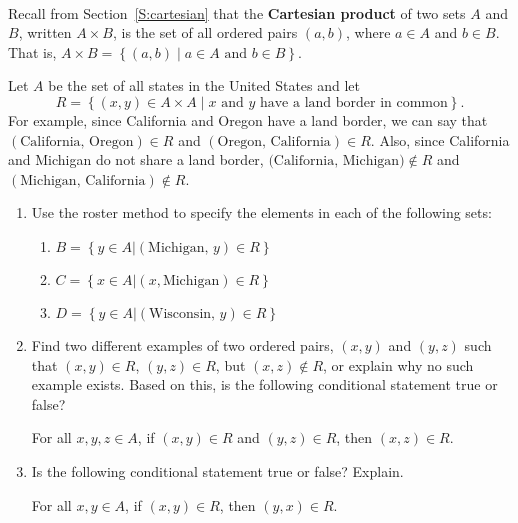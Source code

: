 \begin{previewactivity} \label{PA:USA} \hfill \\
Recall from Section~\ref{S:cartesian} that the \textbf{Cartesian product}
%
 of two sets  $A$  and  $B$, written  $A \times B$, is the set of all ordered pairs  
$\left( {a,b} \right)$,  where  $a \in A$  and  $b \in B$.  That is,
$A \times B = \left\{ {\left( {a,b} \right)  \mid a \in A\text{ and }b \in B} \right\}$.

\noindent
Let  $A$  be the set of all states in the United States and let
\[
R = \left\{ { {\left( {x, y} \right) \in A \times A } \mid x \text{  and  }y 
\text{  have a land border in common}} \right\}\!.
\]
For example, since California and Oregon have a land border, we can say that 
$(\text{California, Oregon}) \in R$ and $(\text{Oregon, California}) \in R$.  Also, since California and Michigan do not share a land border, $\text{(California, Michigan)} \notin R$ and 
$(\text{Michigan, California}) \notin R$.
\begin{enumerate}
\item Use the roster method  to specify the elements in each of the following sets:
\begin{enumerate}
\item $B = \left\{ {y \in A\left| {\left( {\text{Michigan, }y} \right) \in R} \right.} \right\}$

\item $C = \left\{ {x \in A\left| {\left( {x,\text{Michigan}} \right) \in R} \right.} \right\}$

\item $D = \left\{ {y \in A\left| {\left( {\text{Wisconsin, }y} \right) \in R} \right.} \right\}$

\end{enumerate}

\item Find two different examples of two ordered pairs,  $\left( {x, y} \right)$ and 
$\left( {y, z} \right)$ such that  $\left( {x, y} \right) \in R$,  
$\left( {y, z} \right) \in R$,  but  $\left( {x, z} \right)\not  \in R$, or explain why no such example exists.  Based on this, is the following conditional statement true or false?
\begin{center}
For all $x, y, z \in A$, if $(x, y) \in R$ and $(y, z) \in R$, then $(x, z) \in R$.
\end{center}

\item Is the following conditional statement true or false?  Explain.
\begin{center}
For all $x, y \in A$, if $(x, y) \in R$, then $(y, x) \in R$.
\end{center}



\end{enumerate}
\end{previewactivity}
